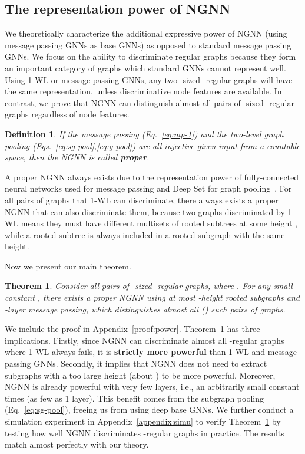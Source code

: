 \documentclass{article}
\newtheorem{theorem}{Theorem}
\newtheorem{definition}{Definition}
\begin{document}
\subsection{The representation power of NGNN}
We theoretically characterize the additional expressive power of NGNN (using message passing GNNs as base GNNs) as opposed to standard message passing GNNs. We focus on the ability to discriminate regular graphs because they form an important category of graphs which standard GNNs cannot represent well. Using 1-WL or message passing GNNs, any two -sized -regular graphs will have the same representation, unless discriminative node features are available. In contrast, we prove that NGNN can distinguish almost all pairs of -sized -regular graphs regardless of node features. 





\begin{definition}
If the message passing (Eq.~\ref{eq:mp-1}) and the two-level graph pooling (Eqs.~\ref{eq:sg-pool},\ref{eq:g-pool}) are all injective given input from a countable space, then the NGNN is called \textbf{proper}.
\end{definition}



A proper NGNN always exists due to the representation power of fully-connected neural networks used for message passing and Deep Set for graph pooling~\citep{zaheer2017deep}. For all pairs of graphs that 1-WL can discriminate, there always exists a proper NGNN that can also discriminate them, because two graphs discriminated by 1-WL means they must have different multisets of rooted subtrees at some height , while a rooted subtree is always included in a rooted subgraph with the same height.

Now we present our main theorem.
\begin{theorem}\label{thm:power}
Consider all pairs of -sized -regular graphs, where . For any small constant , there exists a proper NGNN using at most -height rooted subgraphs and -layer message passing, which distinguishes almost all () such pairs of graphs. 
\end{theorem}

We include the proof in Appendix~\ref{proof:power}. Theorem~\ref{thm:power} has three implications. Firstly, since NGNN can discriminate almost all -regular graphs where 1-WL always fails, it is \textbf{strictly more powerful} than 1-WL and message passing GNNs. Secondly, it implies that NGNN does not need to extract subgraphs with a too large height (about ) to be more powerful. Moreover, NGNN is already powerful with very few layers, i.e., an arbitrarily small constant  times  (as few as 1 layer). This benefit comes from the subgraph pooling (Eq.~\ref{eq:sg-pool}), freeing us from using deep base GNNs. We further conduct a simulation experiment in Appendix~\ref{appendix:simu} to verify Theorem~\ref{thm:power} by testing how well NGNN discriminates -regular graphs in practice. The results match almost perfectly with our theory.
\end{document}
